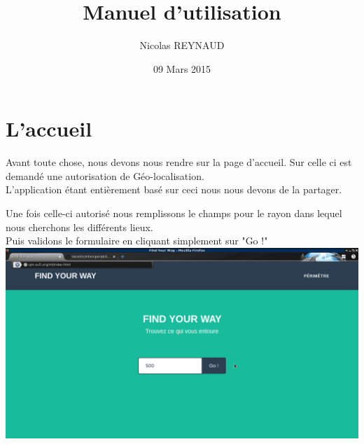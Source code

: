 \documentclass[10pt,a4paper, landscape]{report}
\author{Nicolas REYNAUD}
\title{Manuel d'utilisation}
\date{\vfill 09 Mars 2015}
\begin{document}
\maketitle
\newpage


\renewcommand{\contentsname}{Sommaire}
\tableofcontents
\newpage


\section{L'accueil}

Avant toute chose, nous devons nous rendre sur la page d'accueil. Sur celle ci est demandé une autorisation de Géo-localisation.\\
L'application étant entièrement basé sur ceci nous nous devons de la partager.\\

\newpage
Une fois celle-ci autorisé nous remplissons le champs pour le rayon dans lequel nous cherchons les différents lieux. \\
Puis validons le formulaire en cliquant simplement sur "Go !" \\
\includegraphics[scale=0.5]{images/accueil_rempli.png} 
\end{document}
